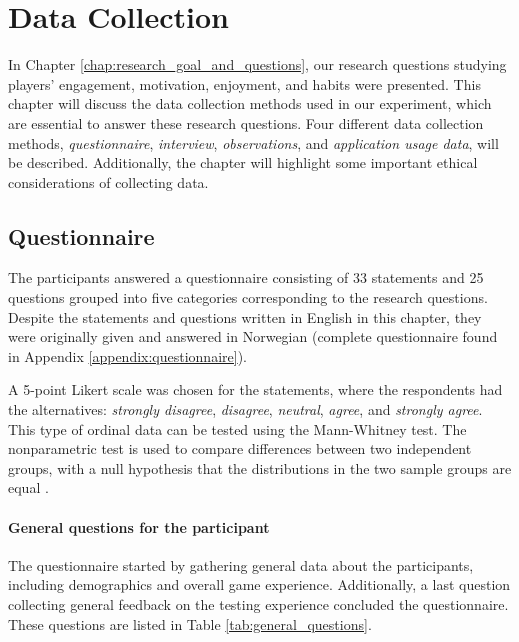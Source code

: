 \section{Data Collection}
\label{chap:data_collection}
In Chapter \ref{chap:research_goal_and_questions}, our research questions studying players’ engagement, motivation, enjoyment, and habits were presented. This chapter will discuss the data collection methods used in our experiment, which are essential to answer these research questions. Four different data collection methods, \textit{questionnaire}, \textit{interview}, \textit{observations}, and \textit{application usage data}, will be described. Additionally, the chapter will highlight some important ethical considerations of collecting data.


\subsection{Questionnaire}
\label{sec:data_collection_questionaire}
The participants answered a questionnaire consisting of 33 statements and 25 questions grouped into five categories corresponding to the research questions. Despite the statements and questions written in English in this chapter, they were originally given and answered in Norwegian (complete questionnaire found in Appendix \ref{appendix:questionnaire}).

A 5-point Likert scale was chosen for the statements, where the respondents had the alternatives: \textit{strongly disagree}, \textit{disagree}, \textit{neutral}, \textit{agree}, and \textit{strongly agree}. This type of ordinal data can be tested using the Mann-Whitney test. The nonparametric test is used to compare differences between two independent groups, with a null hypothesis that the distributions in the two sample groups are equal \citep{lamorte_mann_2017}.

\paragraph*{General questions for the participant}
The questionnaire started by gathering general data about the participants, including demographics and overall game experience. Additionally, a last question collecting general feedback on the testing experience concluded the questionnaire. These questions are listed in Table \ref{tab:general_questions}.

